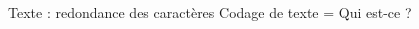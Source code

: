 \documentclass[9pt, aspectratio=169]{beamer}
\begin{document}
\begin{frame}{Texte : redondance des caractères} %
Codage de texte = \og Qui est-ce ? \fg{}
\begin{columns}
   \begin{column}{0.6\textwidth}
        
        

\end{column}
\end{columns}
\end{frame}
\end{document}
